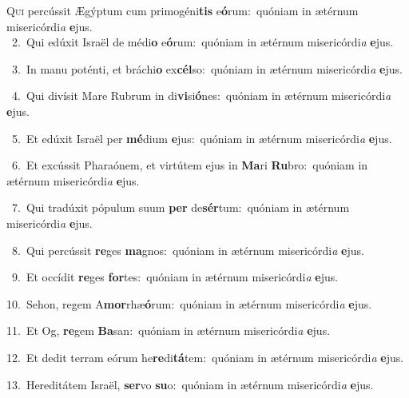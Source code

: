 \lettrine{\initial\textcolor{\initialcolor}{Q}}{ui} percússit Ægýptum cum primogéni\textbf{tis} e\-\textbf{ó}\-rum:~\star quóniam in ætérnum misericórdi\textit{a} \textbf{e}\-jus.\\
{\numbfont\textcolor{\numbcolor}{~2.}}~Qui edúxit Israël de médi\textbf{o} e\-\textbf{ó}\-rum:~\star quóniam in ætérnum misericórdi\textit{a} \textbf{e}\-jus.\par
{\numbfont\textcolor{\numbcolor}{~3.}}~In manu poténti, et bráchi\textbf{o} ex\-\textbf{cél}\-so:~\star quóniam in ætérnum misericórdi\textit{a} \textbf{e}\-jus.\par
{\numbfont\textcolor{\numbcolor}{~4.}}~Qui divísit Mare Rubrum in di\-\textbf{vi}\-si\-\textbf{ó}\-nes:~\star quóniam in ætérnum misericórdi\textit{a} \textbf{e}\-jus.\par
{\numbfont\textcolor{\numbcolor}{~5.}}~Et edúxit Israël per \textbf{mé}\-dium \textbf{e}\-jus:~\star quóniam in ætérnum misericórdi\textit{a} \textbf{e}\-jus.\par
{\numbfont\textcolor{\numbcolor}{~6.}}~Et excússit Pharaónem, et virtútem ejus in \textbf{Ma}\-ri \textbf{Ru}\-bro:~\star quóniam in ætérnum misericórdi\textit{a} \textbf{e}\-jus.\par
{\numbfont\textcolor{\numbcolor}{~7.}}~Qui tradúxit pópulum suum \textbf{per} de\-\textbf{sér}\-tum:~\star quóniam in ætérnum misericórdi\textit{a} \textbf{e}\-jus.\par
{\numbfont\textcolor{\numbcolor}{~8.}}~Qui percússit \textbf{re}\-ges \textbf{ma}\-gnos:~\star quóniam in ætérnum misericórdi\textit{a} \textbf{e}\-jus.\par
{\numbfont\textcolor{\numbcolor}{~9.}}~Et occídit \textbf{re}\-ges \textbf{for}\-tes:~\star quóniam in ætérnum misericórdi\textit{a} \textbf{e}\-jus.\par
{\numbfont\textcolor{\numbcolor}{10.}}~Sehon, regem A\-\textbf{mor}\-rhæ\-\textbf{ó}\-rum:~\star quóniam in ætérnum misericórdi\textit{a} \textbf{e}\-jus.\par
{\numbfont\textcolor{\numbcolor}{11.}}~Et Og, \textbf{re}\-gem \textbf{Ba}\-san:~\star quóniam in ætérnum misericórdi\textit{a} \textbf{e}\-jus.\par
{\numbfont\textcolor{\numbcolor}{12.}}~Et dedit terram eórum he\-\textbf{re}\-di\-\textbf{tá}\-tem:~\star quóniam in ætérnum misericórdi\textit{a} \textbf{e}\-jus.\par
{\numbfont\textcolor{\numbcolor}{13.}}~Hereditátem Israël, \textbf{ser}\-vo \textbf{su}\-o:~\star quóniam in ætérnum misericórdi\textit{a} \textbf{e}\-jus.\par
